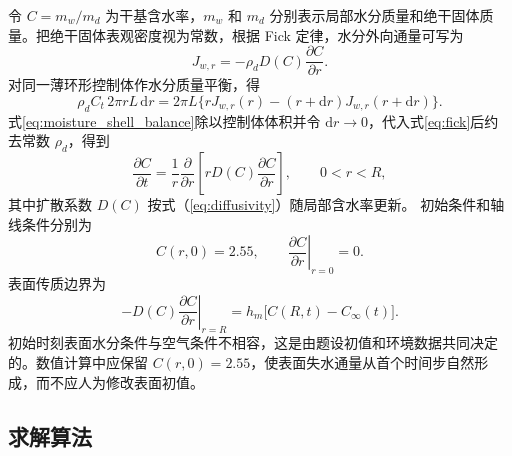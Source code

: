 \documentclass[withoutpreface,bwprint]{cumcmthesis}
\begin{document}
令 $C=m_w/m_d$ 为干基含水率，$m_w$ 和 $m_d$ 分别表示局部水分质量和绝干固体质量。把绝干固体表观密度视为常数，根据 Fick 定律，水分外向通量可写为
\begin{equation}
J_{w,r}=-\rho_dD(C)\frac{\partial C}{\partial r}.
\label{eq:fick}
\end{equation}
对同一薄环形控制体作水分质量平衡，得
\begin{equation}
\rho_d C_t\,2\pi rL\,\mathrm dr
=2\pi L\{rJ_{w,r}(r)-(r+\mathrm dr)J_{w,r}(r+\mathrm dr)\}.
\label{eq:moisture_shell_balance}
\end{equation}
式\eqref{eq:moisture_shell_balance}除以控制体体积并令 $\mathrm dr\to0$，代入式\eqref{eq:fick}后约去常数 $\rho_d$，得到
\begin{equation}
\frac{\partial C}{\partial t}
=\frac{1}{r}\frac{\partial}{\partial r}
\left[rD(C)\frac{\partial C}{\partial r}\right],
\qquad 0<r<R,
\label{eq:moisture_pde}
\end{equation}
其中扩散系数 $D(C)$ 按式（\ref{eq:diffusivity}）随局部含水率更新。
初始条件和轴线条件分别为
\begin{equation}
C(r,0)=2.55,\qquad
\left.\frac{\partial C}{\partial r}\right|_{r=0}=0.
\label{eq:moisture_initial_center}
\end{equation}
表面传质边界为
\begin{equation}
-D(C)\left.\frac{\partial C}{\partial r}\right|_{r=R}
=h_m\bigl[C(R,t)-C_\infty(t)\bigr].
\label{eq:moisture_robin}
\end{equation}
初始时刻表面水分条件与空气条件不相容，这是由题设初值和环境数据共同决定的。数值计算中应保留 $C(r,0)=2.55$，使表面失水通量从首个时间步自然形成，而不应人为修改表面初值。

\subsection{求解算法}
\end{document}
